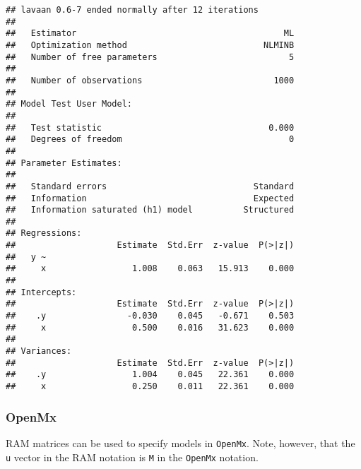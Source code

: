 \documentclass[
]{book}
\theoremstyle{definition}
\theoremstyle{definition}
\theoremstyle{definition}
\theoremstyle{remark}
\begin{document}
\begin{verbatim}
## lavaan 0.6-7 ended normally after 12 iterations
## 
##   Estimator                                         ML
##   Optimization method                           NLMINB
##   Number of free parameters                          5
##                                                       
##   Number of observations                          1000
##                                                       
## Model Test User Model:
##                                                       
##   Test statistic                                 0.000
##   Degrees of freedom                                 0
## 
## Parameter Estimates:
## 
##   Standard errors                             Standard
##   Information                                 Expected
##   Information saturated (h1) model          Structured
## 
## Regressions:
##                    Estimate  Std.Err  z-value  P(>|z|)
##   y ~                                                 
##     x                 1.008    0.063   15.913    0.000
## 
## Intercepts:
##                    Estimate  Std.Err  z-value  P(>|z|)
##    .y                -0.030    0.045   -0.671    0.503
##     x                 0.500    0.016   31.623    0.000
## 
## Variances:
##                    Estimate  Std.Err  z-value  P(>|z|)
##    .y                 1.004    0.045   22.361    0.000
##     x                 0.250    0.011   22.361    0.000
\end{verbatim}

\hypertarget{openmx-openmx2020}{%
\subsubsection{\texorpdfstring{OpenMx \citep{OpenMx2020}}{OpenMx {[}@OpenMx2020{]}}}\label{openmx-openmx2020}}

RAM matrices can be used to specify models in \texttt{OpenMx}.
Note, however, that the \texttt{u} vector in the RAM notation is
\texttt{M} in the \texttt{OpenMx} notation.
\end{document}
